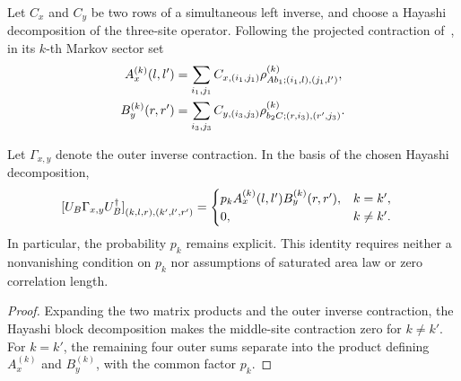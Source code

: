 \begin{definition}
    \label{def:mpdo_bnt_markov_factors}
    \leanok
    Let $C_x$ and $C_y$ be two rows of a simultaneous left inverse, and
    choose a Hayashi decomposition of the three-site operator. Following the
    projected contraction of~\cite[Appendix~C.2, lines~1719--1725]{Cirac2016MPDO_arXiv},
    in its $k$-th Markov sector set
    \begin{align}
        A_x^{(k)}(l,l')
         & =\sum_{i_1,j_1} C_{x,(i_1,j_1)}
        \rho_{A b_1;(i_1,l),(j_1,l')}^{(k)},
        \notag                             \\
        B_y^{(k)}(r,r')
         & =\sum_{i_3,j_3} C_{y,(i_3,j_3)}
        \rho_{b_2 C;(r,i_3),(r',j_3)}^{(k)}.
        \notag
    \end{align}
\end{definition}

\begin{lemma}
    \label{thm:mpdo_bnt_outer_inverse_markov_block}
    \leanok
    Let $\Gamma_{x,y}$ denote the outer inverse contraction. In the basis of
    the chosen Hayashi decomposition,
    \begin{align}
        {[U_B\Gamma_{x,y}U_B^\dagger]}_
        {(k,l,r),(k',l',r')}
         & =
        \begin{cases}
            p_k A_x^{(k)}(l,l')B_y^{(k)}(r,r'), & k=k',    \\
            0,                                  & k\ne k'.
        \end{cases}
        \notag
    \end{align}
    In particular, the probability $p_k$ remains explicit. This identity
    requires neither a nonvanishing condition on $p_k$ nor assumptions of
    saturated area law or zero correlation length.
\end{lemma}

\begin{proof}\leanok
    Expanding the two matrix products and the outer inverse contraction, the
    Hayashi block decomposition makes the middle-site contraction zero for
    $k\ne k'$. For $k=k'$, the remaining four outer sums separate into the
    product defining $A_x^{(k)}$ and $B_y^{(k)}$, with the common factor $p_k$.
\end{proof}

